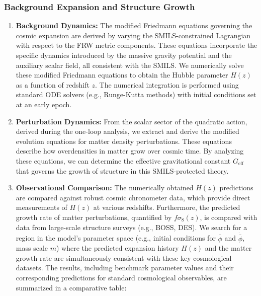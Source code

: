 \documentclass[twocolumn]{aastex631}
\begin{document}
\subsubsection{Background Expansion and Structure Growth}
\begin{enumerate}
    \item \textbf{Background Dynamics:} The modified Friedmann equations governing the cosmic expansion are derived by varying the SMILS-constrained Lagrangian with respect to the FRW metric components. These equations incorporate the specific dynamics introduced by the massive gravity potential and the auxiliary scalar field, all consistent with the SMILS. We numerically solve these modified Friedmann equations to obtain the Hubble parameter $H(z)$ as a function of redshift $z$. The numerical integration is performed using standard ODE solvers (e.g., Runge-Kutta methods) with initial conditions set at an early epoch.
    \item \textbf{Perturbation Dynamics:} From the scalar sector of the quadratic action, derived during the one-loop analysis, we extract and derive the modified evolution equations for matter density perturbations. These equations describe how overdensities in matter grow over cosmic time. By analyzing these equations, we can determine the effective gravitational constant $G_{\text{eff}}$ that governs the growth of structure in this SMILS-protected theory.
    \item \textbf{Observational Comparison:} The numerically obtained $H(z)$ predictions are compared against robust cosmic chronometer data, which provide direct measurements of $H(z)$ at various redshifts. Furthermore, the predicted growth rate of matter perturbations, quantified by $f\sigma_8(z)$, is compared with data from large-scale structure surveys (e.g., BOSS, DES). We search for a region in the model's parameter space (e.g., initial conditions for $\bar{\phi}$ and $\dot{\bar{\phi}}$, mass scale $m$) where the predicted expansion history $H(z)$ and the matter growth rate are simultaneously consistent with these key cosmological datasets. The results, including benchmark parameter values and their corresponding predictions for standard cosmological observables, are summarized in a comparative table:


\end{enumerate}
\end{document}
